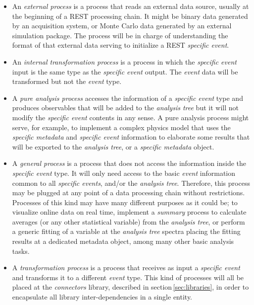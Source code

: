 \begin{itemize}
\item An \emph{external process} is a process that reads an external data source, usually at the beginning of a REST processing chain. It might be binary data generated by an acquisition system, or Monte Carlo data generated by an external simulation package. The process will be in charge of understanding the format of that external data serving to initialize a REST \emph{specific event}.

\item An \emph{internal transformation process} is a process in which the \emph{specific event} input is the same type as the \emph{specific event} output. The \emph{event} data will be transformed but not the \emph{event} type.

\item A \emph{pure analysis process} accesses the information of a \emph{specific event} type and produces observables that will be added to the \emph{analysis tree} but it will not modify the \emph{specific event} contents in any sense. A pure analysis process might serve, for example, to implement a complex physics model that uses the \emph{specific metadata} and \emph{specific event} information to elaborate some results that will be exported to the \emph{analysis tree}, or a \emph{specific metadata} object.

\item A \emph{general process} is a process that does not access the information inside the \emph{specific event} type. It will only need access to the basic \emph{event} information common to all \emph{specific events}, and/or the \emph{analysis tree}. Therefore, this process may be plugged at any point of a data processing chain without restrictions. Processes of this kind may have many different purposes as it could be; to visualize online data on real time, implement a \emph{summary} process to calculate averages (or any other statistical variable) from the \emph{analysis tree}, or perform a generic fitting of a variable at the \emph{analysis tree} spectra placing the fitting results at a dedicated metadata object, among many other basic analysis tasks.

\item A \emph{transformation process} is a process that receives as input a \emph{specific event} and transforms it to a different \emph{event} type. This kind of processes will all be placed at the \emph{connectors} library, described in section\,\ref{sec:libraries}, in order to encapsulate all library inter-dependencies in a single entity. 
\end{itemize}

